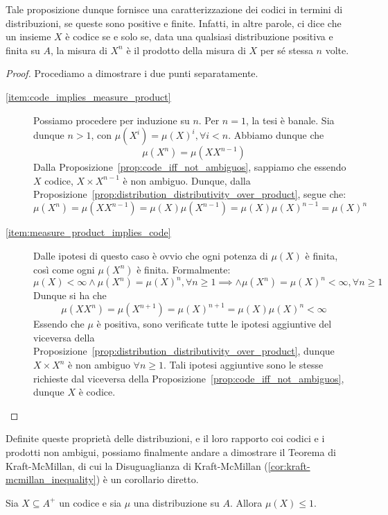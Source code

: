 Tale proposizione dunque fornisce una caratterizzazione dei codici in termini di distribuzioni, se queste sono positive e finite.
Infatti, in altre parole, ci dice che un insieme \(X\) è codice se e solo se, data una qualsiasi distribuzione positiva e finita su \(A\), la misura di \(X^n\) è il prodotto della misura di \(X\) per sé stessa \(n\) volte.
\begin{proof}
  Procediamo a dimostrare i due punti separatamente.
  \begin{description}
    \item[\ref{item:code_implies_measure_product}] Possiamo procedere per induzione su \(n\).
      Per \(n=1\), la tesi è banale.
      Sia dunque \(n>1\), con \(\mu(X^i) = {\mu(X)}^i, \forall i < n\).
      Abbiamo dunque che 
      \[\mu(X^n)=\mu(XX^{n-1})\]
      Dalla Proposizione~\ref{prop:code_iff_not_ambiguos}, sappiamo che essendo \(X\) codice, \(X \times X^{n-1}\) è non ambiguo.
      Dunque, dalla Proposizione~\ref{prop:distribution_distributivity_over_product}, segue che:
      \[\mu(X^n)=\mu(XX^{n-1}) = \mu(X)\mu(X^{n-1}) = \mu(X) {\mu(X)}^{n-1} = {\mu(X)}^n\]

    \item[\ref{item:measure_product_implies_code}] Dalle ipotesi di questo caso è ovvio che ogni potenza di \(\mu(X)\) è finita, così come ogni \(\mu(X^n)\) è finita.
    Formalmente:
    \[\mu(X)<\infty \land \mu(X^n) = {\mu(X)}^n, \forall n \geq 1 \implies \land \mu(X^n) = {\mu(X)}^n < \infty, \forall n \geq 1\]
    Dunque si ha che
    \[\mu(XX^n) = \mu(X^{n+1}) = {\mu(X)}^{n+1} = \mu(X){\mu(X)}^n < \infty\]
    Essendo che \(\mu\) è positiva, sono verificate tutte le ipotesi aggiuntive del viceversa della Proposizione~\ref{prop:distribution_distributivity_over_product}, dunque \(X \times X^n\) è non ambiguo \(\forall n \geq 1\).
    Tali ipotesi aggiuntive sono le stesse richieste dal viceversa della Proposizione~\ref{prop:code_iff_not_ambiguos}, dunque \(X\) è codice.
  \end{description}
\end{proof}
Definite queste proprietà delle distribuzioni, e il loro rapporto coi codici e i prodotti non ambigui, possiamo finalmente andare a dimostrare il Teorema di Kraft-McMillan, di cui la Disuguaglianza di Kraft-McMillan (\ref{cor:kraft-mcmillan_inequality}) è un corollario diretto.

\begin{theorem}\label{thm:kraft-mcmillan}
  Sia \(X \subseteq A^+\) un codice e sia \(\mu\) una distribuzione su \(A\).
  Allora \(\mu(X) \leq 1\).
\end{theorem}

